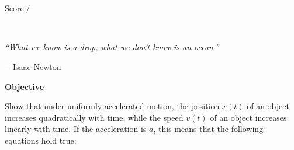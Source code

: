 

\addpoints



\vspace*{-0.2in} %
\noindent
{} 
\makebox[0.25\textwidth][l]{\hrulefill}\\[0.25cm]
\hfill 
{}\hfill
\makebox[0.25\textwidth][l]{ \texttt{\underline\coursename}}\hfill \\[0.25cm]
\makebox[0.65\textwidth]{}\hfill
\makebox[0.25\textwidth][l]{\enspace\texttt{\underline{\term\ \courseyear}}}\hfill 
\hfill{Score:\underline{\hspace{2cm}}/\numpoints}
\vspace{0.5in} %

\begin{centering}
\noindent\textbf{\Large \worksheetname} \\[0.1in]
\end{centering}
\vspace{0.1in}
\epigraph{\itshape``What we know is a drop, what we don't know is an ocean.''}{---Isaac Newton}
\qsp
\textbf{\Large Objective}

\qsp
Show that under uniformly accelerated motion, the position $x(t)$ of an object increases quadratically with time, while the speed $v(t)$ of an object increases linearly with time. If the acceleration is $a$, this means that the following equations hold true:
\qsp


